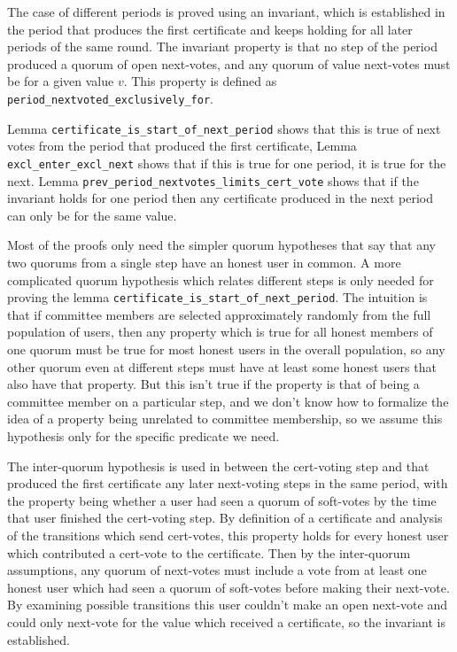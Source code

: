 The case of different periods is proved using an invariant, which is established
in the period that produces the first certificate and keeps holding for all later
periods of the same round.
The invariant property is that no step of the period produced a quorum of
open next-votes, and any quorum of value next-votes must be for a given value $v$.
This property is defined as \lstinline{period_nextvoted_exclusively_for}.

Lemma \lstinline{certificate_is_start_of_next_period} shows that this is true of
next votes from the period that produced the first certificate,
Lemma \lstinline{excl_enter_excl_next} shows that if this is true for one
period, it is true for the next.
Lemma \lstinline{prev_period_nextvotes_limits_cert_vote} shows that if the
invariant holds for one period then any certificate produced in the next period
can only be for the same value.

Most of the proofs only need the simpler quorum hypotheses that say that any
two quorums from a single step have an honest user in common.
A more complicated quorum hypothesis which relates different steps
is only needed for proving the lemma
\lstinline{certificate_is_start_of_next_period}.
The intuition is that if committee members are selected approximately randomly from
the full population of users, then any property which is true for all honest
members of one quorum must be true for most honest users in the overall population,
so any other quorum even at different steps must have at least some honest
users that also have that property.
But this isn't true if the property is that of being a committee member on
a particular step, and we don't know how to formalize the idea of a property
being unrelated to committee membership, so we assume this hypothesis only
for the specific predicate we need.

The inter-quorum hypothesis is used in between the cert-voting step and
that produced the first certificate any later next-voting steps in the same period,
with the property being whether a user had seen a quorum of soft-votes by the
time that user finished the cert-voting step.
By definition of a certificate and analysis of the transitions which send
cert-votes, this property holds for every honest user which contributed a cert-vote
to the certificate.
Then by the inter-quorum assumptions, any quorum of next-votes must include
a vote from at least one honest user which had seen a quorum of soft-votes before
making their next-vote.
By examining possible transitions this user couldn't make an open next-vote and
could only next-vote for the value which received a certificate, so the invariant
is established.


